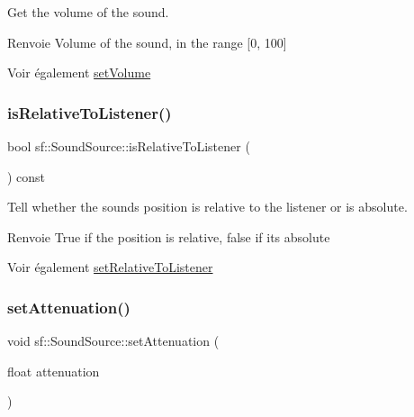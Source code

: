 Get the volume of the sound. 

\begin{DoxyReturn}{Renvoie}
Volume of the sound, in the range \mbox{[}0, 100\mbox{]}
\end{DoxyReturn}
\begin{DoxySeeAlso}{Voir également}
\hyperlink{classsf_1_1SoundSource_a2f192f2b49fb8e2b82f3498d3663fcc2}{set\+Volume} 
\end{DoxySeeAlso}
\mbox{\label{classsf_1_1SoundSource_adcdb4ef32c2f4481d34aff0b5c31534b}} 
\subsubsection{\texorpdfstring{is\+Relative\+To\+Listener()}{isRelativeToListener()}}
{\footnotesize\ttfamily bool sf\+::\+Sound\+Source\+::is\+Relative\+To\+Listener (\begin{DoxyParamCaption}{ }\end{DoxyParamCaption}) const}



Tell whether the sound\textquotesingle{}s position is relative to the listener or is absolute. 

\begin{DoxyReturn}{Renvoie}
True if the position is relative, false if it\textquotesingle{}s absolute
\end{DoxyReturn}
\begin{DoxySeeAlso}{Voir également}
\hyperlink{classsf_1_1SoundSource_ac478a8b813faf7dd575635b102081d0d}{set\+Relative\+To\+Listener} 
\end{DoxySeeAlso}
\mbox{\label{classsf_1_1SoundSource_aa2adff44cd2f8b4e3c7315d7c2a45626}} 
\subsubsection{\texorpdfstring{set\+Attenuation()}{setAttenuation()}}
{\footnotesize\ttfamily void sf\+::\+Sound\+Source\+::set\+Attenuation (\begin{DoxyParamCaption}\item[{float}]{attenuation }\end{DoxyParamCaption})}



